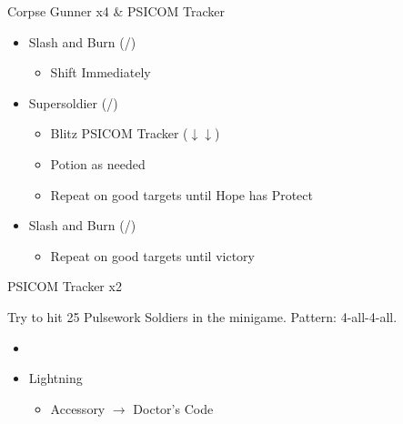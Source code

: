 \begin{multicols}{2}

\renewcommand{\first}{[1] Slash and Burn (\com/\rav)}
\renewcommand{\second}{[2] Supersoldier (\com/\syn)}

\begin{battle}{Corpse Gunner x4 \& PSICOM Tracker}
\begin{itemize}
    \item \first
    \begin{itemize}
        \item Shift Immediately
    \end{itemize}
    \item \second
    \begin{itemize}
        \item Blitz PSICOM Tracker ($\downarrow\downarrow$)
        \item Potion as needed
        \item Repeat on good targets until Hope has Protect
    \end{itemize}
    \item \first
    \begin{itemize}
        \item Repeat on good targets until victory
    \end{itemize}
\end{itemize}
 
\end{battle}
\begin{battle}{PSICOM Tracker x2}
 
\end{battle}

Try to hit 25 Pulsework Soldiers in the minigame. Pattern: 4-all-4-all.

\begin{menu}
\begin{itemize}
    \paradigm
    \begin{itemize}
        \item {}%
{\paradigmline{\com}{\rav}{}}%
{\paradigmline[2]{\textit{\com}}{\textit{\syn}}{}}%
{\paradigmline{\med}{\med}{}}%
{\paradigmline{\rav}{\rav}{}}%
{\paradigmline{[\rav]}{\rav}{}}%
    \end{itemize}
    \equip
    \begin{itemize}
        \item Lightning
        \begin{itemize}
                \item Accessory $\rightarrow$ Doctor's Code
        \end{itemize}
    \end{itemize}
\end{itemize}
\end{menu}


\end{multicols}

